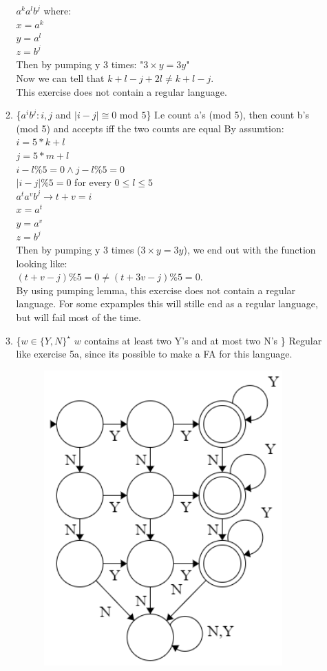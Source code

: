 \documentclass{article}
\begin{document}
\begin{enumerate}
\begin{enumerate}[label=(\alph*)]
			$a^ka^lb^j$ where:\\
			$x = a^k$\\
			$y = a^l$\\
			$z = b^j$\\
			Then by pumping y 3 times: "$3 \times y = 3y$"\\
			Now we can tell that $k+l-j + 2l \neq k + l -j$.\\
			This exercise does not contain a regular language.
			\item \{$a^{i}b^{j} : i,j$ and $|i - j| \cong 0$ mod $5$\} I.e count a's (mod 5), then count b's (mod 5) and accepts iff the two counts are equal
			By assumtion:\\
			$i = 5 * k + l$\\
			$j = 5 * m + l$\\
			$i - l \% 5 = 0 \land j - l \% 5 = 0$\\
			$|i - j| \% 5 = 0$ for every $0\leq l \le 5$ \\ 
			$a^ta^vb^j \rightarrow t + v = i$\\
			$x = a^t$\\
			$y = a^v$\\
			$z = b^j$\\
			Then by pumping y 3 times ($3 \times y = 3y$), we end out with the function looking like:\\
			$(t + v - j) \% 5 = 0 \neq (t + 3v - j) \% 5 = 0$. \\
			By using pumping lemma, this exercise does not contain a regular language. For some expamples this will stille end as a regular language, but will fail most of the time.
			\item \{$w \in \{ Y,N \}^{\star}$ $w$ contains at least two Y's and at most two N's \}
			Regular like exercise 5a, since its possible to make a FA for this language.
			\begin{figure}[H]
				\centering
				\includegraphics[width=0.7\linewidth]{5d}

\end{figure}
\end{enumerate}
\end{enumerate}
\end{document}
